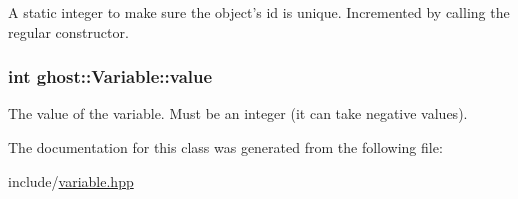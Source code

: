 A static integer to make sure the object's id is unique. Incremented by calling the regular constructor. 

\hypertarget{classghost_1_1Variable_a4623be8dd7ed2a0cb7033aec42033cb7}{
\subsubsection[{value}]{\setlength{\rightskip}{0pt plus 5cm}int ghost\-::\-Variable\-::value\hspace{0.3cm}{\ttfamily [protected]}}}\label{classghost_1_1Variable_a4623be8dd7ed2a0cb7033aec42033cb7}


The value of the variable. Must be an integer (it can take negative values). 



The documentation for this class was generated from the following file\-:\begin{DoxyCompactItemize}
\item 
include/\hyperlink{variable_8hpp}{variable.\-hpp}\end{DoxyCompactItemize}
